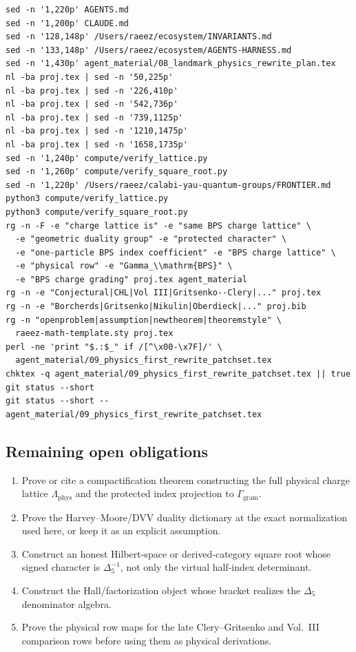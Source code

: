 \begin{verbatim}
sed -n '1,220p' AGENTS.md
sed -n '1,200p' CLAUDE.md
sed -n '128,148p' /Users/raeez/ecosystem/INVARIANTS.md
sed -n '133,148p' /Users/raeez/ecosystem/AGENTS-HARNESS.md
sed -n '1,430p' agent_material/08_landmark_physics_rewrite_plan.tex
nl -ba proj.tex | sed -n '50,225p'
nl -ba proj.tex | sed -n '226,410p'
nl -ba proj.tex | sed -n '542,736p'
nl -ba proj.tex | sed -n '739,1125p'
nl -ba proj.tex | sed -n '1210,1475p'
nl -ba proj.tex | sed -n '1658,1735p'
sed -n '1,240p' compute/verify_lattice.py
sed -n '1,260p' compute/verify_square_root.py
sed -n '1,220p' /Users/raeez/calabi-yau-quantum-groups/FRONTIER.md
python3 compute/verify_lattice.py
python3 compute/verify_square_root.py
rg -n -F -e "charge lattice is" -e "same BPS charge lattice" \
  -e "geometric duality group" -e "protected character" \
  -e "one-particle BPS index coefficient" -e "BPS charge lattice" \
  -e "physical row" -e "Gamma_\\mathrm{BPS}" \
  -e "BPS charge grading" proj.tex agent_material
rg -n -e "Conjectural|CHL|Vol III|Gritsenko--Clery|..." proj.tex
rg -n -e "Borcherds|Gritsenko|Nikulin|Oberdieck|..." proj.bib
rg -n "openproblem|assumption|newtheorem|theoremstyle" \
  raeez-math-template.sty proj.tex
perl -ne 'print "$.:$_" if /[^\x00-\x7F]/' \
  agent_material/09_physics_first_rewrite_patchset.tex
chktex -q agent_material/09_physics_first_rewrite_patchset.tex || true
git status --short
git status --short -- agent_material/09_physics_first_rewrite_patchset.tex
\end{verbatim}

\subsection{Remaining open obligations}

\begin{enumerate}
\item Prove or cite a compactification theorem constructing the full
physical charge lattice \(\Lambda_{\mathrm{phys}}\) and the protected
index projection to \(\Gamma_{\mathrm{gram}}\).
\item Prove the Harvey--Moore/DVV duality dictionary at the exact
normalization used here, or keep it as an explicit assumption.
\item Construct an honest Hilbert-space or derived-category square root
whose signed character is \(\Delta_5^{-1}\), not only the virtual
half-index determinant.
\item Construct the Hall/factorization object whose bracket realizes the
\(\Delta_5\) denominator algebra.
\item Prove the physical row maps for the late Clery--Gritsenko and
Vol.~III comparison rows before using them as physical derivations.
\end{enumerate}
